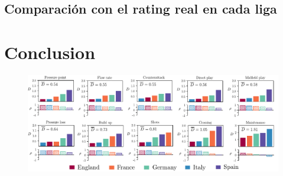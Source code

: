 \documentclass[]{article}
\begin{document}
\subsection{Comparación con el rating real en cada liga}


\section{Conclusion}



\begin{figure}[t!]
\centering
\includegraphics[width=1.\textwidth]{metricas.pdf}
\caption{}
\label{}
\end{figure}










	
\end{document}
